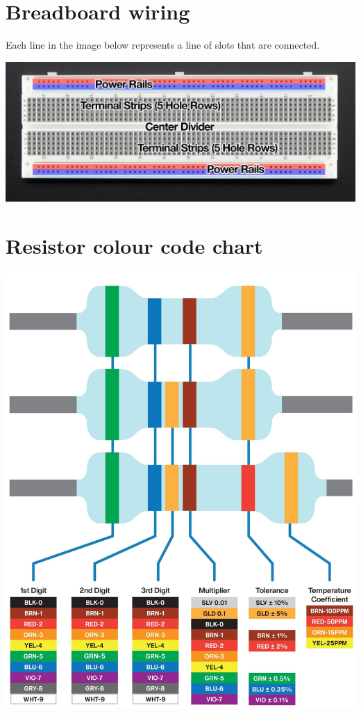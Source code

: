 \documentclass[11pt]{article}
\begin{document}
\section{Breadboard wiring}
\label{sec:org42282ff}
Each line in the image below represents a line of slots that are connected.
\begin{center}
\includegraphics[width=.9\linewidth]{./images/breadboard-wiring.jpg}
\end{center}

\section{Resistor colour code chart}
\label{sec:org13ead5e}
\begin{center}
\includegraphics[width=.9\linewidth]{./images/resistor-colour-code-chart.jpg}
\end{center}
\end{document}
